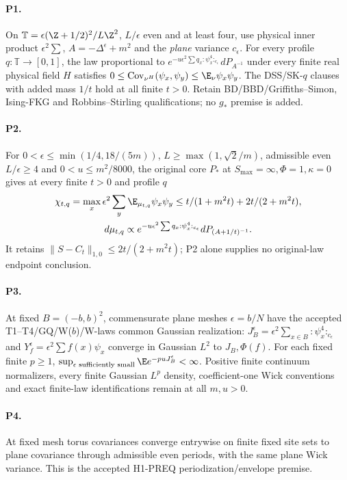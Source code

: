 \paragraph{P1.}
On $\mathbb T=\epsilon(\Z+1/2)^2/L\Z^2$, $L/\epsilon$ even and at least
four, use physical inner product $\epsilon^2\sum$, $A=-\Delta^\epsilon+m^2$
and the \emph{plane} variance $c_\epsilon$. For every profile
$q:\mathbb T\to[0,1]$, the law proportional to
$e^{-u\epsilon^2\sum q_x:\psi_x^4:_{c_\epsilon}}dP_{A^{-1}}$ under every
finite real physical field $H$ satisfies
$0\le\operatorname{Cov}_{\nu^H}(\psi_x,\psi_y)\le\E_\nu\psi_x\psi_y$.
The DSS/SK-$q$ clauses with added mass $1/t$ hold at all finite $t>0$.
Retain BD/BBD/Griffiths--Simon, Ising-FKG and Robbins--Stirling qualifications;
no $g_*$ premise is added.

\paragraph{P2.}
For $0<\epsilon\le\min(1/4,18/(5m))$, $L\ge\max(1,\sqrt2/m)$,
admissible even $L/\epsilon\ge4$ and $0<u\le m^2/8000$, the original core
$P_*$ at $S_{\max}=\infty,\Phi=1,\kappa=0$ gives at every finite $t>0$
and profile $q$
\begin{gather*}
 \chi_{t,q}=\max_x\epsilon^2\sum_y\E_{\mu_{t,q}}\psi_x\psi_y
 \le t/(1+m^2t)+2t/(2+m^2t),\\
 d\mu_{t,q}\propto e^{-u\epsilon^2\sum q_x:\psi_x^4:_{c_\epsilon}}
                          dP_{(A+1/t)^{-1}}.
\end{gather*}
It retains $\|S-C_t\|_{1,0}\le2t/(2+m^2t)$; P2 alone supplies no
original-law endpoint conclusion.

\paragraph{P3.}
At fixed $B=(-b,b)^2$, commensurate plane meshes $\epsilon=b/N$ have the
accepted T1--T4/GQ/W($b$)/W-laws common Gaussian realization:
$J_B^\epsilon=\epsilon^2\sum_{x\in B}:\psi_x^4:_{c_\epsilon}$ and
$Y_f^\epsilon=\epsilon^2\sum f(x)\psi_x$ converge in Gaussian $L^2$
to $J_B,\Phi(f)$. For each fixed finite $p\ge1$,
$\sup_{\epsilon\text{ sufficiently small}}\E e^{-puJ_B^\epsilon}<\infty$.
Positive finite continuum normalizers, every finite Gaussian $L^p$
density, coefficient-one Wick conventions and exact finite-law
identifications remain at all $m,u>0$.

\paragraph{P4.}
At fixed mesh torus covariances converge entrywise on finite fixed site sets
to plane covariance through admissible even periods, with the same plane
Wick variance. This is the accepted H1-PREQ periodization/envelope premise.


